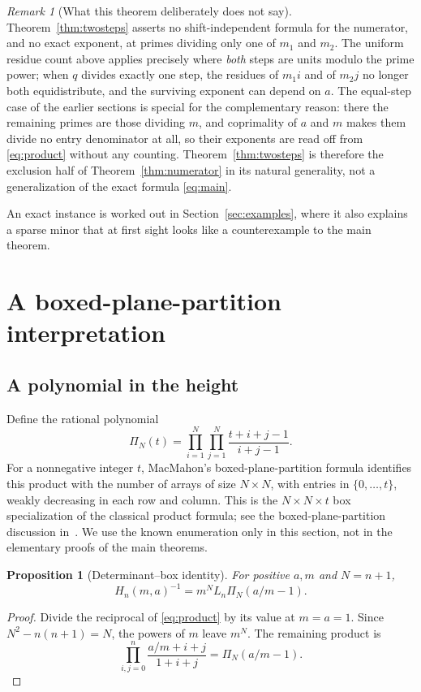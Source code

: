 \documentclass[11pt,a4paper]{article}
\numberwithin{equation}{section}
\newtheorem{proposition}[theorem]{Proposition}
\theoremstyle{definition}
\theoremstyle{remark}
\newtheorem{remark}[theorem]{Remark}
\newcommand{\PP}{\Pi}
\begin{document}
\begin{remark}[What this theorem deliberately does not say]\label{rem:twostepscope}
Theorem~\ref{thm:twosteps} asserts no shift-independent formula for the numerator, and no exact exponent, at primes dividing only one of $m_1$ and $m_2$. The uniform residue count above applies precisely where \emph{both} steps are units modulo the prime power; when $q$ divides exactly one step, the residues of $m_1i$ and of $m_2j$ no longer both equidistribute, and the surviving exponent can depend on $a$. The equal-step case of the earlier sections is special for the complementary reason: there the remaining primes are those dividing $m$, and coprimality of $a$ and $m$ makes them divide no entry denominator at all, so their exponents are read off from \eqref{eq:product} without any counting. Theorem~\ref{thm:twosteps} is therefore the exclusion half of Theorem~\ref{thm:numerator} in its natural generality, not a generalization of the exact formula \eqref{eq:main}.
\end{remark}

An exact instance is worked out in Section~\ref{sec:examples}, where it also explains a sparse minor that at first sight looks like a counterexample to the main theorem.

\section{A boxed-plane-partition interpretation}\label{sec:partitions}

\subsection{A polynomial in the height}
Define the rational polynomial
\begin{equation}\label{eq:PP}
 \PP_N(t)=\prod_{i=1}^N\prod_{j=1}^N\frac{t+i+j-1}{i+j-1}.
\end{equation}
For a nonnegative integer $t$, MacMahon's boxed-plane-partition formula identifies this product with the number of arrays of size $N\times N$, with entries in $\{0,\ldots,t\}$, weakly decreasing in each row and column. This is the $N\times N\times t$ box specialization of the classical product formula; see the boxed-plane-partition discussion in~\cite{krattenthaler}. We use the known enumeration only in this section, not in the elementary proofs of the main theorems.

\begin{proposition}[Determinant--box identity]\label{prop:box}
For positive $a,m$ and $N=n+1$,
\begin{equation}\label{eq:boxidentity}
 H_n(m,a)^{-1}=m^N L_n\PP_N(a/m-1).
\end{equation}
\end{proposition}
\begin{proof}
Divide the reciprocal of \eqref{eq:product} by its value at $m=a=1$. Since $N^2-n(n+1)=N$, the powers of $m$ leave $m^N$. The remaining product is
\[
 \prod_{i,j=0}^n\frac{a/m+i+j}{1+i+j}
 =\PP_N(a/m-1).
\]
\end{proof}
\end{document}
